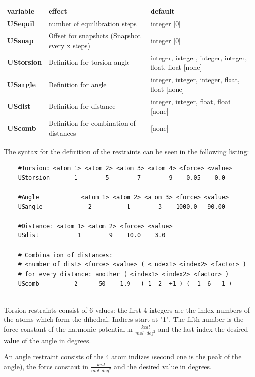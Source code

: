 \documentclass[10pt,a4paper]{article} %
\begin{document}
	\begin{longtable}{|p{3cm}|p{5cm}|p{3cm}|}
		variable & effect & default \\
		\hline
		\textbf{USequil} & number of equilibration steps & integer [0] \\
		\textbf{USsnap} & Offset for snapshots (Snapshot every x steps) & integer [0]  \\
		\textbf{UStorsion} & Definition for torsion angle & integer, integer, integer, integer, float, float [none] \\
		\textbf{USangle} & Definition for angle & integer, integer, integer, float, float [none] \\
		\textbf{USdist} & Definition for distance & integer, integer, float, float [none] \\
		\textbf{UScomb} & Definition for combination of distances & [none] \\
	\end{longtable}

	The syntax for the definition of the restraints can be seen in the following listing:\\
    
	\begin{lstlisting}
	#Torsion: <atom 1> <atom 2> <atom 3> <atom 4> <force> <value>
	UStorsion       1        5        7        9    0.05    0.0
	
	#Angle            <atom 1> <atom 2> <atom 3> <force> <value>
	USangle             2          1        3    1000.0   90.00  
	
	#Distance: <atom 1> <atom 2> <force> <value>
	USdist           1        9    10.0    3.0
	
	# Combination of distances:
	# <number of dist> <force> <value> ( <index1> <index2> <factor> ) 
	# for every distance: another ( <index1> <index2> <factor> ) 
	UScomb          2      50   -1.9   ( 1  2  +1 ) (  1  6  -1 )
	\end{lstlisting}
	~\\
	Torsion restraints consist of 6 values: the first 4 integers are the index numbers of the atoms which form the dihedral. Indices start at "1". The fifth number is the force constant of the harmonic potential in $\frac{kcal}{mol \cdot deg^2}$ and the last index the desired value of the angle in degrees.
	
	An angle restraint consists of the 4 atom indizes (second one is the peak of the angle), the force constant in $\frac{kcal}{mol \cdot deg^2}$ and the desired value in degrees.
	
\end{document}
